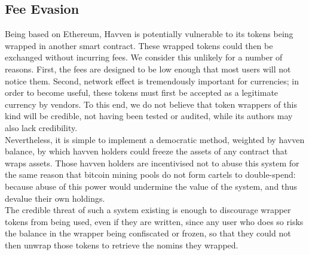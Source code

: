 \newpage 

\subsection{Fee Evasion}

\noindent Being based on Ethereum, Havven is potentially vulnerable to its tokens being wrapped in another
smart contract. These wrapped tokens could then be exchanged without incurring fees. We consider this 
unlikely for a number of reasons. First, the fees are designed to be low enough that most users
will not notice them. Second, network effect is tremendously important for currencies; in order to
become useful, these tokens must first be accepted as a legitimate currency by vendors. To this end,
we do not believe that token wrappers of this kind will be credible, not having been tested or audited,
while its authors may also lack credibility. \\

\noindent Nevertheless, it is simple to implement a democratic method, weighted by havven balance,
by which havven holders could freeze the assets of any contract that wraps assets.
Those havven holders are incentivised not to abuse this system for the same reason that
bitcoin mining pools do not form cartels to double-spend: because abuse of this power
would undermine the value of the system, and thus devalue their own holdings. \\

\noindent The credible threat of such a system existing is enough to discourage wrapper
tokens from being used, even if they are written, since any user who does so risks the balance
in the wrapper being confiscated or frozen, so that they could not then unwrap those tokens
to retrieve the nomins they wrapped.

\newpage
